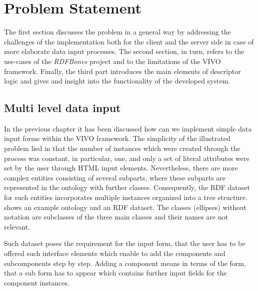 \chapter{Problem Statement}

The first section discusses the problem in a general way by addressing the challenges of the implementation both for the client and the server side in case of more elaborate data input processes. The second section, in turn, refers to the use-cases of the \textit{RDFBones} project and to the limitations of the VIVO framework. Finally, the third part introduces the main elements of descriptor logic and gives and insight into the functionality of the developed system. 

\section{Multi level data input}

In the previous chapter it has been discussed how can we implement simple data input forms within the VIVO framework. The simplicity of the illustrated problem lied in that the number of instances which were created through the process was constant, in particular, one, and only a set of literal attributes were set by the user through HTML input elements. Nevertheless, there are more complex entities consisting of several subparts, where these subparts are represented in the ontology with further classes. Consequently, the RDF dataset for such entities incorporates multiple instances organized into a tree structure.  shows an example ontology and an RDF dataset. The classes (ellipses) without notation are subclasses of the three main classes and their names are not relevant.


Such dataset poses the requirement for the input form, that the user has to be offered such interface elements which enable to add the components and subcomponents step by step. Adding a component means in terms of the form, that a sub form has to appear which contains further input fields for the component instances.


